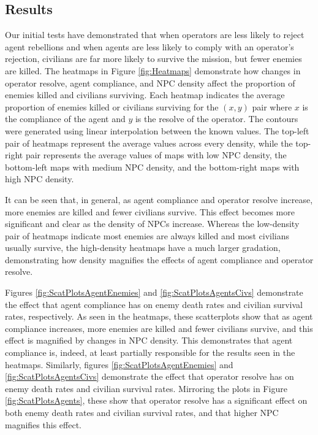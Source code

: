 \documentclass[letterpaper,11pt]{article}
\begin{document}
	\subsection{Results}
	Our initial tests have demonstrated that when operators are less likely to reject agent rebellions and when agents are less likely to comply with an operator's rejection, civilians are far more likely to survive the mission, but fewer enemies are killed. The heatmaps in Figure \ref{fig:Heatmaps} demonstrate how changes in operator resolve, agent compliance, and NPC density affect the proportion of enemies killed and civilians surviving. Each heatmap indicates the average proportion of enemies killed or civilians surviving for the $(x,y)$ pair where $x$ is the compliance of the agent and $y$ is the resolve of the operator. The contours were generated using linear interpolation between the known values. The top-left pair of heatmaps represent the average values across every density, while the top-right pair represents the average values of maps with low NPC density, the bottom-left maps with medium NPC density, and the bottom-right maps with high NPC density. \par
	
	It can be seen that, in general, as agent compliance and operator resolve increase, more enemies are killed and fewer civilians survive. This effect becomes more significant and clear as the density of NPCs increase. Whereas the low-density pair of heatmaps indicate most enemies are always killed and most civilians usually survive, the high-density heatmaps have a much larger gradation, demonstrating how density magnifies the effects of agent compliance and operator resolve. \par
	
	Figures \ref{fig:ScatPlotsAgentEnemies} and \ref{fig:ScatPlotsAgentsCivs} demonstrate the effect that agent compliance has on enemy death rates and civilian survival rates, respectively. As seen in the heatmaps, these scatterplots show that as agent compliance increases, more enemies are killed and fewer civilians survive, and this effect is magnified by changes in NPC density. This demonstrates that agent compliance is, indeed, at least partially responsible for the results seen in the heatmaps. Similarly, figures \ref{fig:ScatPlotsAgentEnemies} and \ref{fig:ScatPlotsAgentsCivs} demonstrate the effect that operator resolve has on enemy death rates and civilian survival rates. Mirroring the plots in Figure \ref{fig:ScatPlotsAgents}, these show that operator resolve has a significant effect on both enemy death rates and civilian survival rates, and that higher NPC magnifies this effect. 
	
\end{document}
